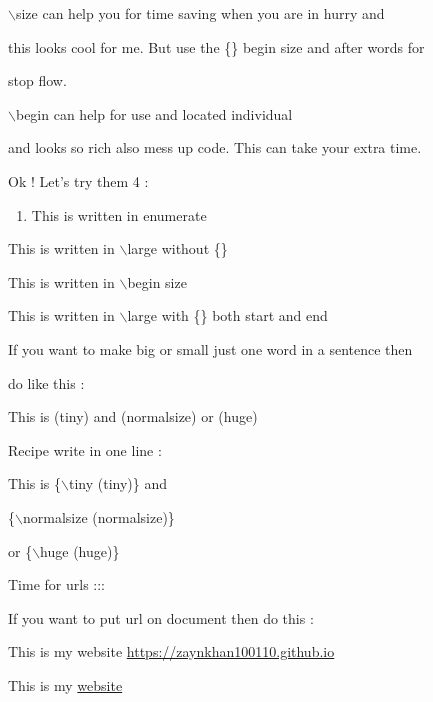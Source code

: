 \documentclass[11pt]{article}
\begin{document}
\vspace{1cm}

$\backslash$size can help you for time saving when you are in hurry and

this looks cool for me. But use the \{\} begin size and after words for

stop flow.

$\backslash$begin can help for use and located individual 

and looks so rich
also mess up code. This can take your extra time.

\pagebreak

Ok ! Let's try them 4 :

\begin{enumerate}
\item \large{This is written in enumerate}
\end{enumerate}

\large This is written in $\backslash$large without \{\}

\begin{large}
This is written in $\backslash$begin size
\end{large}

{\large This is written in $\backslash$large with \{\} both start and end }

\vspace{1cm}

If you want to make big or small just one word in a sentence then 

do like this :

This is  {\tiny (tiny)} and {\normalsize(normalsize)} or {\huge(huge)}

Recipe write in one line :

This is \{$\backslash$tiny (tiny)\} and 

\{$\backslash$normalsize (normalsize)\}

or \{$\backslash$huge (huge)\}

\vspace{1cm}

\pagebreak

{\Large Time for urls ::: }

If you want to put url on document then do this :

\vspace{1cm}

This is my website  \url{https://zaynkhan100110.github.io}

This is my  \href{https://zaynkhan100110.github.io}{website}
\end{document}
